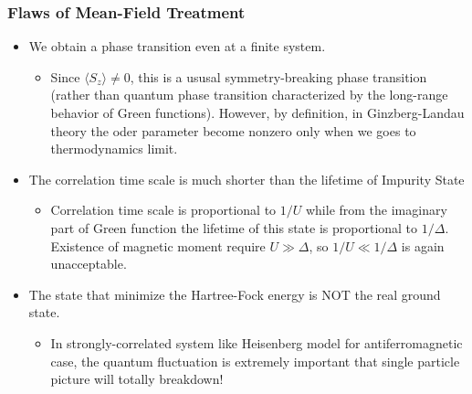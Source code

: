 \documentclass[10pt,aspectratio=43,xcolor=x11names,t]{beamer}%
\begin{document}
		\begin{frame}[t]\frametitle{Flaws of Mean-Field Treatment}
			\begin{itemize}
				\item {\color{blue}We obtain a phase transition even at a finite system}. 
					\begin{itemize}
					 	\item Since $\langle S_z \rangle\neq0$, this is a ususal symmetry-breaking phase transition (rather than quantum phase transition characterized by the long-range behavior of Green functions). However, by definition, in Ginzberg-Landau theory the oder parameter become nonzero only when we goes to thermodynamics limit.
					 \end{itemize}
				\item {\color{blue}The correlation time scale is much shorter than the lifetime of Impurity State}
					\begin{itemize}
						\item Correlation time scale is proportional to $1/U$ while from the imaginary part of Green function the lifetime of this state is proportional to $1/\Delta$. Existence of magnetic moment require $U\gg\Delta$, so $1/U\ll1/\Delta$ is again unacceptable.
					\end{itemize}
				\item {\color{blue}The state that minimize the Hartree-Fock energy is NOT the real ground state.}
					\begin{itemize}
						\item In strongly-correlated system like Heisenberg model for antiferromagnetic case, the quantum fluctuation is extremely important that single particle picture will totally breakdown!
					\end{itemize}
			\end{itemize}
		\end{frame}
\end{document}
